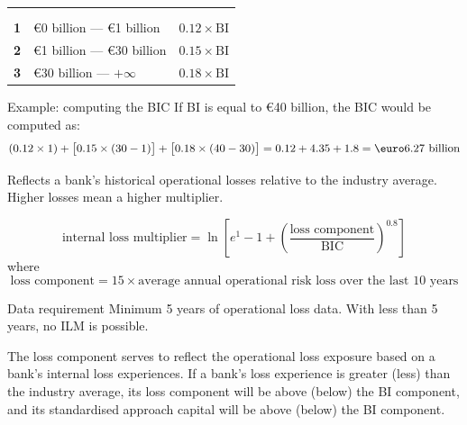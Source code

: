 \noindent\begin{minipage}{\textwidth}
\renewcommand{\arraystretch}{1.35}
\begin{tabularx}{\textwidth}{@{}L{0.14\textwidth}YL{0.26\textwidth}@{}}
\\
  &  & \\
{\tabfont \textbf{1}} & {\tabfont \euro0 billion --- \euro1 billion} & {\tabfont $0.12\times \mathrm{BI}$}\\
{\tabfont \textbf{2}} & {\tabfont \euro1 billion --- \euro30 billion} & {\tabfont $0.15\times \mathrm{BI}$}\\
{\tabfont \textbf{3}} & {\tabfont \euro30 billion --- $+\infty$} & {\tabfont $0.18\times \mathrm{BI}$}\\
\end{tabularx}
\end{minipage}

\begin{orexambox}{Example: computing the BIC}
If BI is equal to \euro40 billion, the BIC would be computed as:
\[
(0.12\times1)+\bigl[0.15\times(30-1)\bigr]+\bigl[0.18\times(40-30)\bigr]
=0.12+4.35+1.8=\text{\euro}6.27\text{ billion}
\]
\end{orexambox}


Reflects a bank's historical operational losses relative to the industry average.
Higher losses mean a higher multiplier.

\begin{orkeybox}
\[
\text{internal loss multiplier}=\ln\!\left[e^{1}-1+
\left(\frac{\text{loss component}}{\mathrm{BIC}}\right)^{\!0.8}\right]
\]
where
\[
\text{loss component}=15\times\text{average annual operational risk loss over the last 10 years}
\]
\end{orkeybox}

\begin{ornotebox}{Data requirement}
Minimum 5 years of operational loss data. With less than 5 years, no ILM is
possible.
\end{ornotebox}

The loss component serves to reflect the operational loss exposure based on a
bank's internal loss experiences. If a bank's loss experience is greater (less)
than the industry average, its loss component will be above (below) the BI
component, and its standardised approach capital will be above (below) the BI
component.

